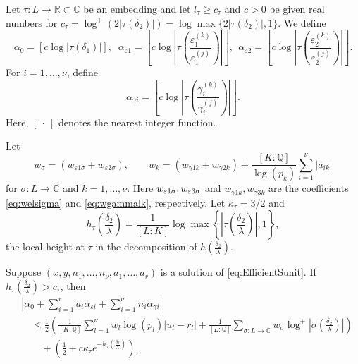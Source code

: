 Let $\tau:L\to\mathbb{R} \subset \mathbb{C}$ be an embedding and let $l_\tau\geq c_\tau$ and $c>0$ be given real numbers for $c_\tau=\log^+(2|\tau(\delta_2)|)= \log \max\{2|\tau(\delta_2)|,1\}$. We define 
\begin{equation} \label{eq:alpha0eps}
\alpha_0 = [c\log|\tau(\delta_1)|], \;  \; \alpha_{\varepsilon 1} =  \left[c\log\left|\tau\left(\frac{\varepsilon_1^{(k)}}{\varepsilon_1^{(j)}}\right)\right|\right],\ \  \alpha_{\varepsilon 2} =  \left[c\log\left|\tau\left(\frac{\varepsilon_2^{(k)}}{\varepsilon_2^{(j)}}\right)\right|\right].
\end{equation}
For $i = 1, \dots, \nu$, define
\begin{equation} \label{eq:alphagamma}
\alpha_{\gamma i} = \left[c\log\left|\tau\left(\frac{\gamma_i^{(k)}}{\gamma_i^{(j)}}\right)\right|\right].
\end{equation}
Here, $[ \ \cdot\  ]$ denotes the nearest integer function. 

Let
\begin{equation} \label{eq:wsigma}
w_{\sigma} = (w_{\varepsilon 1 \sigma} + w_{\varepsilon 2 \sigma}), \quad \quad w_k = (w_{\gamma 1 k} + w_{\gamma 2 k}) + \frac{[K:\mathbb{Q}]}{\log(p_k)}\sum_{i=1}^{\nu}|\overline{a}_{ik}|
\end{equation}
for $\sigma: L \to \mathbb{C}$ and $k = 1, \dots, \nu$. Here $w_{\varepsilon 1 \sigma}, w_{\varepsilon 3 \sigma}$ and $w_{\gamma 1 k}, w_{\gamma 3 k}$ are the coefficients \eqref{eq:welsigma} and \eqref{eq:wgammalk}, respectively. Let $\kappa_{\tau} = 3/2$ and 
\[h_{\tau}\left(\frac{\delta_2}{\lambda}\right) = \frac{1}{[L:K]}\log \max \left\{ \left|\tau\left(\frac{\delta_2}{\lambda}\right)\right|, 1\right\},\]
the local height at $\tau$ in the decomposition of $h\left(\frac{\delta_2}{\lambda}\right)$.

\begin{lemma}\label{lem:archellest}
Suppose $(x,y, n_1, \dots, n_{\nu}, a_1, \dots, a_r)$ is a solution of \eqref{eq:EfficientSunit}. If ${h_{\tau} \left(\frac{\delta_2}{\lambda}\right) > c_{\tau}}$, then  
\begin{align*}
& \left|\alpha_0+\sum_{i = 1}^r a_i \alpha_{\varepsilon i} + \sum_{i = 1}^{\nu} n_i \alpha_{\gamma i}\right| \\
	& \quad \leq \frac{1}{2}\left(\frac{1}{[K:\mathbb{Q}]}\sum_{l = 1}^{\nu}w_l \log(p_l)|u_l - r_l| + \frac{1}{[L:\mathbb{Q}]}\sum_{\sigma :L \to \mathbb{C}} w_{\sigma}\log^+ \left|\sigma\left(\frac{\delta_2}{\lambda}\right)\right| \right)\\
	&\quad\quad + \left(\frac{1}{2} + c\kappa_{\tau}e^{-h_{\tau}\left(\frac{\delta_2}{\lambda}\right)}\right).
\end{align*} 
\end{lemma}

